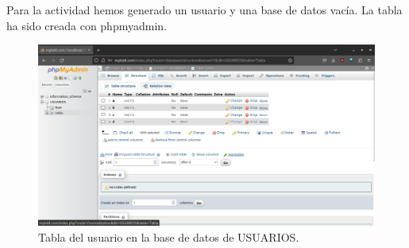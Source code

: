 Para la actividad hemos generado un usuario y una base de datos vacía. La tabla ha sido creada con phpmyadmin.
\begin{figure}[H]
	\centering
	\includegraphics[scale=0.30]{09}
	\caption{Tabla del usuario en la base de datos de USUARIOS.}
\end{figure}







%



%


